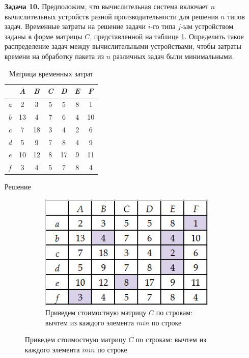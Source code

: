 \documentclass{article}
\begin{document}
\clearpage%
\begin{enumerate}
\item[\textbf{Задача 10.}] Предположим, что вычислительная система включает $n$ вычислительных устройств разной производительности для решения $n$ типов задач. Временные затраты на решение задачи $i$-го типа $j$-ым устройством заданы в форме матрицы $C$, представленной на таблице \ref{tab:10_Cmatrix}. Определить такое распределение задач между вычислительными устройствами, чтобы затраты времени на обработку пакета из $n$ различных задач были минимальными.
\begin{table}[!ht]
    \centering
    \begin{tabular}{|c|c|c|c|c|c|c|}
    \hline
        & \textit{A} & \textit{B} & \textit{C} & \textit{D} & \textit{E} & \textit{F} \\ \hline
        \textit{a} & 2 & 3 & 5 & 5 & 8 & 1 \\ \hline
        \textit{b} & 13 & 4 & 7 & 6 & 4 & 10 \\ \hline
        \textit{c} & 7 & 18 & 3 & 4 & 2 & 6 \\ \hline
        \textit{d} & 5 & 9 & 7 & 8 & 4 & 9 \\ \hline
        \textit{e} & 10 & 12 & 8 & 17 & 9 & 11 \\ \hline
        \textit{f} & 3 & 4 & 5 & 7 & 8 & 4 \\ \hline
    \end{tabular}
    \caption{Матрица временных затрат}
    \label{tab:10_Cmatrix}
\end{table}
\begin{center}
Решение 
\end{center}
\begin{figure}[ht]
     \centering
     \begin{subfigure}[b]{0.3\textwidth}
        \centering
         \caption*{\small{Приведем стоимостную матрицу $C$ по строкам: вычтем из каждого элемента $min$ по строке}}
         \includegraphics[width=\textwidth]{attachments/10/01.png}

\end{subfigure}
\end{figure}
\end{enumerate}
\end{document}
